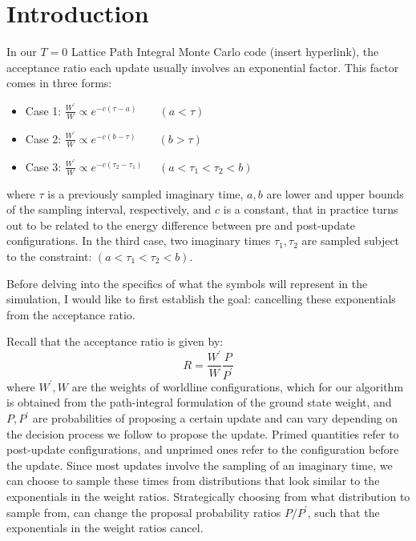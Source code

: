 \documentclass[12pt, two sided]{article}
\begin{document}


\section{Introduction}

In our $T=0$ Lattice Path Integral Monte Carlo code (insert hyperlink), the acceptance ratio each update usually involves an exponential factor. This factor comes in three forms:

\begin{itemize}
 \item Case 1: $\frac{W^\prime}{W} \propto e^{-c(\tau-a)} \;\;\;\;\;\;\; (a<\tau)$ \\
 \item Case 2: $\frac{W^\prime}{W} \propto e^{-c(b-\tau)} \;\;\;\;\;\;\; (b>\tau)$ \\
 \item Case 3: $\frac{W^\prime}{W} \propto e^{-c(\tau_2-\tau_1)} \;\;\;\;\; (a < \tau_1 < \tau_2 < b)$ 
 \end{itemize}

where $\tau$ is a previously sampled imaginary time, $a,b$ are lower and upper bounds of the sampling interval, respectively, and $c$ is a constant, that in practice turns out to be related to the energy difference between pre and post-update configurations. In the third case, two imaginary times $\tau_1, \tau_2$ are sampled subject to the constraint: $(a<\tau_1<\tau_2<b)$.

Before delving into the specifics of what the symbols will represent in the simulation, I would like to first establish the goal: cancelling these exponentials from the acceptance ratio. 

Recall that the acceptance ratio is given by:
%
\begin{equation}
R = \frac{W^\prime}{W} \frac{P}{P^\prime}
\end{equation}
%
where $W^\prime,W$ are the weights of worldline configurations, which for our algorithm is obtained from the path-integral formulation of the ground state weight, and $P,P^\prime$ are probabilities of proposing a certain update and can vary depending on the decision process we follow to propose the update. Primed quantities refer to post-update configurations, and unprimed ones refer to the configuration before the update. Since most updates involve the sampling of an imaginary time, we can choose to sample these times from distributions that look similar to the exponentials in the weight ratios. Strategically choosing from what distribution to sample from, can change the proposal probability ratios $P/P^\prime$, such that the exponentials in the weight ratios cancel.
\end{document}
